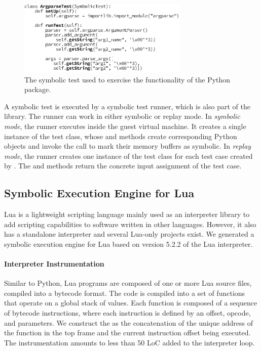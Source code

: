 \begin{figure}
  \centering
  \includegraphics[width=3.2in]{figures/evaluation/symtest}
  \caption{The symbolic test used to exercise the functionality of the Python  package.}
  \label{fig:sample-test}
\end{figure}

A symbolic test is executed by a symbolic test runner, which is also part of the library.  The runner can work in either symbolic or replay mode. 
%
In \emph{symbolic mode}, the runner executes inside the guest virtual machine.  It creates a single instance of the test class, whose  and  methods create corresponding Python objects and invoke the  call to mark their memory buffers as symbolic.
%
In \emph{replay mode}, the runner creates one instance of the test class for each test case created by \chef. The  and  methods return the concrete input assignment of the test case.


\subsection{Symbolic Execution Engine for Lua}
\label{sec:eval:lua-proto}

Lua is a lightweight scripting language mainly used as an interpreter library to add scripting capabilities to software written in other languages. However, it also has a standalone interpreter and several Lua-only projects exist. We generated a symbolic execution engine for Lua based on version 5.2.2 of the Lua interpreter.

\paragraph{Interpreter Instrumentation}

Similar to Python, Lua programs are composed of one or more Lua source files, compiled into a bytecode format.  The code is compiled into a set of functions that operate on a global stack of values.  Each function is composed of a sequence of bytecode instructions, where each instruction is defined by an offset, opcode, and parameters.
%
We construct the \hlpc as the concatenation of the unique address of the function in the top frame and the current instruction offset being executed.  The instrumentation amounts to less than 50 LoC added to the interpreter loop.

